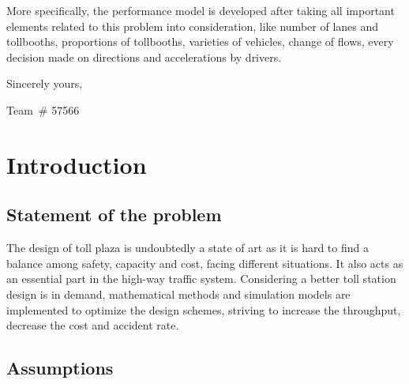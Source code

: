 \documentclass{mcmthesis}
\begin{document}
More specifically, the performance model is developed after taking all important elements related to this problem into consideration, like number of lanes and tollbooths, proportions of tollbooths, varieties of vehicles, change of flows, every decision made on directions and accelerations by drivers.\vspace{7ex}

Sincerely yours,


Team\ \# 57566

\clearpage

\section{Introduction}

\subsection{Statement of the problem}

The design of toll plaza is undoubtedly a state of art as it is hard to find a balance among safety, capacity and cost, facing different situations. It also acts as an essential part in the high-way traffic system. Considering a better toll station design is in demand, mathematical methods and simulation models are implemented to optimize the design schemes, striving to increase the throughput, decrease the cost and accident rate.

\subsection{Assumptions}
\end{document}
